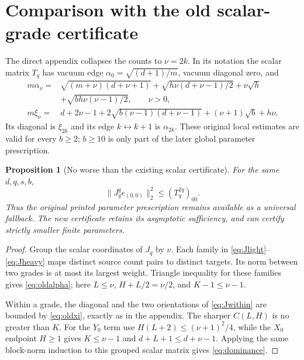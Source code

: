 \documentclass[11pt]{article}
\numberwithin{equation}{section}
\newtheorem{proposition}[theorem]{Proposition}
\theoremstyle{definition}\newtheorem{definition}[theorem]{Definition}
\theoremstyle{remark}\newtheorem{remark}[theorem]{Remark}
\newcommand{\norm}[1]{\lVert#1\rVert}\newcommand{\ip}[2]{\langle#1,#2\rangle}
\begin{document}
\section{Comparison with the old scalar-grade certificate}
\label{sec:comparison}
The direct appendix collapses the counts to $\nu=2k$. In its notation the scalar matrix $T_q$ has vacuum edge $\alpha_0=\sqrt{(d+1)/m}$, vacuum diagonal zero, and
\begin{align}
 m\alpha_\nu={}&\sqrt{(m+\nu)(d+\nu+1)}
  +\sqrt{h\nu(d+\nu-1)/2}+\nu\sqrt h\nonumber\\
 &+\sqrt{bh\nu(\nu-1)/2},\qquad \nu>0,
 \label{eq:oldalpha}\\
 m\xi_\nu={}&d+2\nu-1+2\sqrt{b(\nu-1)(d+\nu-1)}
            +(\nu+1)\sqrt b+h\nu.
 \label{eq:oldxi}
\end{align}
Its diagonal is $\xi_{2k}$ and its edge $k\leftrightarrow k+1$ is $\alpha_{2k}$. These original local estimates are valid for every $b\ge2$; $b\ge10$ is only part of the later global parameter prescription.

\begin{proposition}[No worse than the existing scalar certificate]
For the same $d,q,s,b$,
\begin{equation}
 \norm{J_q^qe_{(0,0)}}_2^2\le(T_q^{2q})_{00}.
 \label{eq:dominance}
\end{equation}
Thus the original printed parameter prescription remains available as a universal fallback. The new certificate retains its asymptotic sufficiency, and can certify strictly smaller finite parameters.
\end{proposition}
\begin{proof}
Group the scalar coordinates of $J_q$ by $\nu$. Each family in \eqref{eq:Jlight}--\eqref{eq:Jheavy} maps distinct source count pairs to distinct targets. Its norm between two grades is at most its largest weight. Triangle inequality for these families gives \eqref{eq:oldalpha}; here $L\le\nu$, $H+L/2=\nu/2$, and $K-1\le\nu-1$.

Within a grade, the diagonal and the two orientations of \eqref{eq:Jwithin} are bounded by \eqref{eq:oldxi}, exactly as in the appendix. The sharper $C(L,H)$ is no greater than $K$. For the $Y_0$ term use $H(L+2)\le(\nu+1)^2/4$, while the $X_0$ endpoint $H\ge1$ gives $K\le\nu-1$ and $d+L+1\le d+\nu-1$. Applying the same block-norm induction to this grouped scalar matrix gives \eqref{eq:dominance}.
\end{proof}

\end{document}

